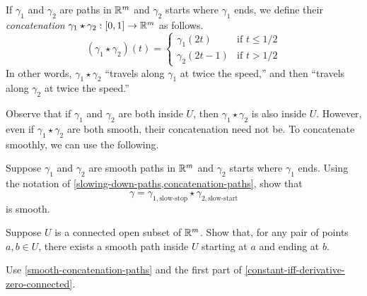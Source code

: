 \begin{definition} \label{concatenation-paths}
	If $\gamma_1$ and $\gamma_2$ are paths in $\mathbb{R}^m$ and $\gamma_2$ starts where $\gamma_1$ ends, we define their \emph{concatenation} $\gamma_1 \star \gamma_2 : [0,1] \to \mathbb{R}^m$ as follows.
	\[ (\gamma_1 \star \gamma_2)(t) = \begin{cases} \gamma_1(2t) & \text{if } t \leq 1/2 \\ \gamma_2(2t-1) & \text{if } t > 1/2 \end{cases} \]
	In other words, $\gamma_1 \star \gamma_2$ ``travels along $\gamma_1$ at twice the speed,'' and then ``travels along $\gamma_2$ at twice the speed.''
\end{definition}

Observe that if $\gamma_1$ and $\gamma_2$ are both inside $U$, then $\gamma_1 \star \gamma_2$ is also inside $U$. However, even if $\gamma_1 \star \gamma_2$ are both smooth, their concatenation need not be. To concatenate smoothly, we can use the following. 

\begin{exercise} \label{smooth-concatenation-paths}
	Suppose $\gamma_1$ and $\gamma_2$ are smooth paths in $\mathbb{R}^m$ and $\gamma_2$ starts where $\gamma_1$ ends. Using the notation of \cref{slowing-down-paths,concatenation-paths}, show that
	\[ \gamma = \gamma_{1,\text{slow-stop}} \star \gamma_{2,\text{slow-start}} \]
	is smooth. 
\end{exercise}

\begin{exercise} \label{smoothly-path-connected}
	Suppose $U$ is a connected open subset of $\mathbb{R}^m$. Show that, for any pair of points $a, b \in U$, there exists a smooth path inside $U$ starting at $a$ and ending at $b$. 
	\begin{hint}
		Use \cref{smooth-concatenation-paths} and the first part of \cref{constant-iff-derivative-zero-connected}. 
	\end{hint}
\end{exercise}